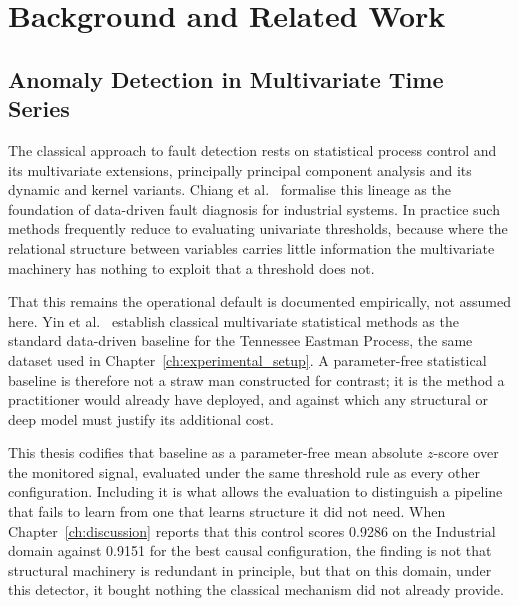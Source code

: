 \chapter{Background and Related Work}
\label{ch:related}

\section{Anomaly Detection in Multivariate Time Series}
\label{sec:rw-ad}

The classical approach to fault detection rests on statistical process control and its multivariate extensions, principally principal component analysis and its dynamic and kernel variants. Chiang et al.~\cite{chiang2001faultdetection} formalise this lineage as the foundation of data-driven fault diagnosis for industrial systems. In practice such methods frequently reduce to evaluating univariate thresholds, because where the relational structure between variables carries little information the multivariate machinery has nothing to exploit that a threshold does not.

That this remains the operational default is documented empirically, not assumed here. Yin et al.~\cite{yin2012comparison} establish classical multivariate statistical methods as the standard data-driven baseline for the Tennessee Eastman Process, the same dataset used in Chapter~\ref{ch:experimental_setup}. A parameter-free statistical baseline is therefore not a straw man constructed for contrast; it is the method a practitioner would already have deployed, and against which any structural or deep model must justify its additional cost.

This thesis codifies that baseline as a parameter-free mean absolute $z$-score over the monitored signal, evaluated under the same threshold rule as every other configuration. Including it is what allows the evaluation to distinguish a pipeline that fails to learn from one that learns structure it did not need. When Chapter~\ref{ch:discussion} reports that this control scores 0.9286 on the Industrial domain against 0.9151 for the best causal configuration, the finding is not that structural machinery is redundant in principle, but that on this domain, under this detector, it bought nothing the classical mechanism did not already provide.

